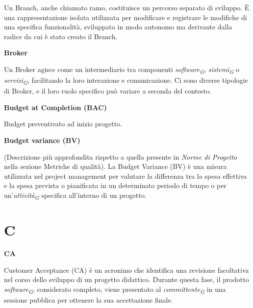 \documentclass{article}
\begin{document}
Un Branch, anche chiamato ramo, costituisce un percorso separato di sviluppo. È una rappresentazione isolata utilizzata per modificare e registrare le modifiche di una specifica funzionalità, sviluppata in modo autonomo ma derivante dalla radice da cui è stato creato il Branch.

\vspace{0.4cm}

\textbf{Broker}

\vspace{0.1cm}

Un Broker agisce come un intermediario tra componenti \textit{software}\textsubscript{\textit{G}}, \textit{sistemi}\textsubscript{\textit{G}} o \textit{servizi}\textsubscript{\textit{G}}, facilitando la loro interazione e comunicazione. Ci sono diverse tipologie di Broker, e il loro ruolo specifico può variare a seconda del contesto.

\vspace{0.4cm}

\textbf{Budget at Completion (BAC)}

\vspace{0.1cm}

Budget preventivato ad inizio progetto.

\vspace{0.4cm}

\textbf{Budget variance (BV)}

\vspace{0.1cm}

(Descrizione più approfondita rispetto a quella presente in \textit{Norme di Progetto} nella sezione Metriche di qualità).
La Budget Variance (BV) è una misura utilizzata nel project management per valutare la differenza tra la spesa effettiva e la spesa prevista o pianificata in un determinato periodo di tempo o per un'\textit{attività}\textsubscript{\textit{G}} specifica all'interno di un progetto.

\pagebreak
\section*{C}
{}

\vspace{0.4cm}

\textbf{CA}

\vspace{0.1cm}

Customer Acceptance (CA) è un acronimo che identifica una revisione facoltativa nel corso dello sviluppo di un progetto didattico. Durante questa fase, il prodotto \textit{software}\textsubscript{\textit{G}}, considerato completo, viene presentato al \textit{committente}\textsubscript{\textit{G}} in una sessione pubblica per ottenere la sua accettazione finale.
\end{document}
